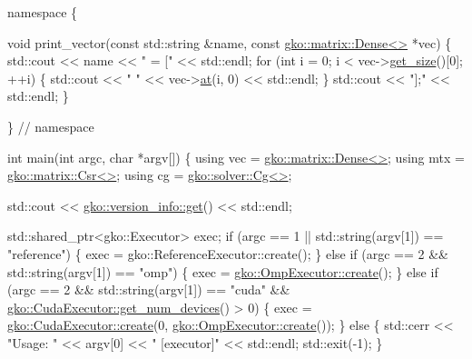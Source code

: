 \begin{DoxyCodeInclude}
\textcolor{keyword}{namespace }\{


\textcolor{keywordtype}{void} print\_vector(\textcolor{keyword}{const} std::string &name, \textcolor{keyword}{const} \hyperlink{classgko_1_1matrix_1_1Dense}{gko::matrix::Dense<>} *vec)
\{
    std::cout << name << \textcolor{stringliteral}{" = ["} << std::endl;
    \textcolor{keywordflow}{for} (\textcolor{keywordtype}{int} i = 0; i < vec->\hyperlink{classgko_1_1LinOp_a31b3c003388eb0b95393154f68c2b98d}{get\_size}()[0]; ++i) \{
        std::cout << \textcolor{stringliteral}{"    "} << vec->\hyperlink{classgko_1_1matrix_1_1Dense_af0f1af68853537807ca271a296de3cd0}{at}(i, 0) << std::endl;
    \}
    std::cout << \textcolor{stringliteral}{"];"} << std::endl;
\}


\}  \textcolor{comment}{// namespace}


\textcolor{keywordtype}{int} main(\textcolor{keywordtype}{int} argc, \textcolor{keywordtype}{char} *argv[])
\{
    \textcolor{keyword}{using} vec = \hyperlink{classgko_1_1matrix_1_1Dense}{gko::matrix::Dense<>};
    \textcolor{keyword}{using} mtx = \hyperlink{classgko_1_1matrix_1_1Csr}{gko::matrix::Csr<>};
    \textcolor{keyword}{using} cg = \hyperlink{classgko_1_1solver_1_1Cg}{gko::solver::Cg<>};

    std::cout << \hyperlink{classgko_1_1version__info_a6daeb8a087cfb57fa055526fc133d8eb}{gko::version\_info::get}() << std::endl;

    std::shared\_ptr<gko::Executor> exec;
    \textcolor{keywordflow}{if} (argc == 1 || std::string(argv[1]) == \textcolor{stringliteral}{"reference"}) \{
        exec = gko::ReferenceExecutor::create();
    \} \textcolor{keywordflow}{else} \textcolor{keywordflow}{if} (argc == 2 && std::string(argv[1]) == \textcolor{stringliteral}{"omp"}) \{
        exec = \hyperlink{classgko_1_1OmpExecutor_a33ca05fdd0fc928ee262fc9425304874}{gko::OmpExecutor::create}();
    \} \textcolor{keywordflow}{else} \textcolor{keywordflow}{if} (argc == 2 && std::string(argv[1]) == \textcolor{stringliteral}{"cuda"} &&
               \hyperlink{classgko_1_1CudaExecutor_aef0258494d14de0e56149b920c5173e5}{gko::CudaExecutor::get\_num\_devices}() > 0) \{
        exec = \hyperlink{classgko_1_1CudaExecutor_a2718a92034350650ef406ffdb60db090}{gko::CudaExecutor::create}(0, 
      \hyperlink{classgko_1_1OmpExecutor_a33ca05fdd0fc928ee262fc9425304874}{gko::OmpExecutor::create}());
    \} \textcolor{keywordflow}{else} \{
        std::cerr << \textcolor{stringliteral}{"Usage: "} << argv[0] << \textcolor{stringliteral}{" [executor]"} << std::endl;
        std::exit(-1);
    \}


\end{DoxyCodeInclude}

